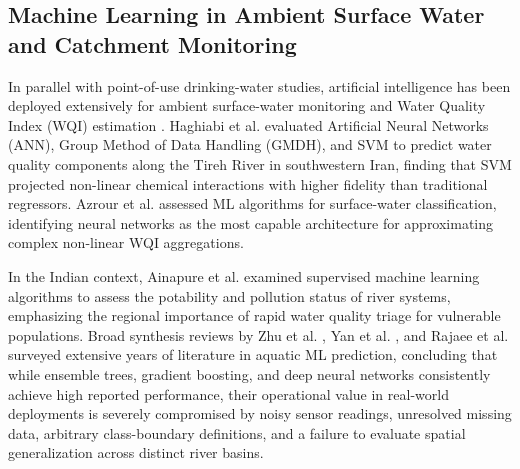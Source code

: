 \documentclass[pdflatex,sn-mathphys-num]{sn-jnl}%
\theoremstyle{thmstyleone}%
\theoremstyle{thmstyletwo}%
\theoremstyle{thmstylethree}%
\begin{document}
\subsection{Machine Learning in Ambient Surface Water and Catchment Monitoring}\label{subsec2_2}
In parallel with point-of-use drinking-water studies, artificial intelligence has been deployed extensively for ambient surface-water monitoring and Water Quality Index (WQI) estimation \cite{horton1965,brown1970,tyagi2013,abbasi2012}. Haghiabi et al. \cite{haghiabi2018} evaluated Artificial Neural Networks (ANN), Group Method of Data Handling (GMDH), and SVM to predict water quality components along the Tireh River in southwestern Iran, finding that SVM projected non-linear chemical interactions with higher fidelity than traditional regressors. Azrour et al. \cite{azrour2022} assessed ML algorithms for surface-water classification, identifying neural networks as the most capable architecture for approximating complex non-linear WQI aggregations.

In the Indian context, Ainapure et al. \cite{ainapure2023} examined supervised machine learning algorithms to assess the potability and pollution status of river systems, emphasizing the regional importance of rapid water quality triage for vulnerable populations. Broad synthesis reviews by Zhu et al. \cite{zhu2022}, Yan et al. \cite{yan2024}, and Rajaee et al. \cite{rajaee2019} surveyed extensive years of literature in aquatic ML prediction, concluding that while ensemble trees, gradient boosting, and deep neural networks consistently achieve high reported performance, their operational value in real-world deployments is severely compromised by noisy sensor readings, unresolved missing data, arbitrary class-boundary definitions, and a failure to evaluate spatial generalization across distinct river basins.
\end{document}
